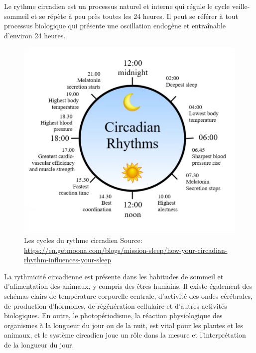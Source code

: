 


Le rythme circadien est un processus naturel et interne qui régule le cycle
veille-sommeil et se répète à peu près toutes les 24 heures.
Il peut se référer à tout processus biologique qui présente une oscillation
endogène et entraînable d'environ 24 heures.

\begin{figure}[h]
  \centering
  \includegraphics[scale=2.0]{media/circadien.png}
  \caption{
      Les cycles du rythme circadien\newline
      \tiny{Source: \url{https://en.getmoona.com/blogs/mission-sleep/how-your-circadian-rhythm-influences-your-sleep}}
  }
\end{figure}

La rythmicité circadienne est présente dans les habitudes de sommeil et
d'alimentation des animaux, y compris des êtres humains. Il existe également
des schémas clairs de température corporelle centrale, d'activité des ondes cérébrales,
de production d'hormones, de régénération cellulaire et d'autres activités biologiques.
En outre, le photopériodisme, la réaction physiologique des organismes à la longueur du
jour ou de la nuit, est vital pour les plantes et les animaux, et le système circadien
joue un rôle dans la mesure et l'interprétation de la longueur du jour.

